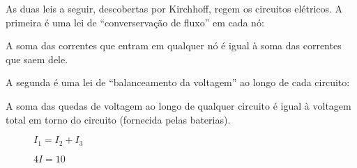 \documentclass{beamer}
\begin{document}
    \begin{frame}
        As duas leis a seguir, descobertas por Kirchhoff, \pause regem os circuitos elétricos. \pause A primeira é uma lei de ``converservação de fluxo'' em cada nó:\pause

        \vspace{1.5cm}

        \begin{definicao}
            A soma das correntes que entram em qualquer nó \pause é igual à soma das correntes que saem dele.
        \end{definicao}
    \end{frame}

    \begin{frame}
        A segunda é uma lei de ``balanceamento da voltagem'' ao longo de cada circuito:\pause

        \vspace{1.5cm}

        \begin{definicao}
            A soma das quedas de voltagem ao longo de qualquer circuito \pause é igual à voltagem total em torno do circuito (fornecida pelas baterias).
        \end{definicao}
    \end{frame}

    \begin{frame}
        \begin{figure}[!h]
            \centering
            
            \caption{$I_1 = I_2 + I_3$}
        \end{figure}
    \end{frame}

    \begin{frame}
        \begin{figure}[!h]
            \centering
            
            \caption{$4I = 10$}
        \end{figure}
    \end{frame}

    \begin{frame}
        \begin{figure}[!h]
            \centering
            
        \end{figure}
    \end{frame}
\end{document}
